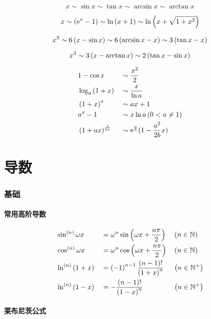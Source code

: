 \documentclass{article}
\begin{document}
\[x\sim\sin x\sim\tan x\sim\arcsin x\sim\arctan x\]

\[x\sim\left(\mathrm e^x-1\right)\sim\ln\left(x+1\right)\sim\ln\left(x+\sqrt{1+x^2}\right)\]

\[x^3\sim6\left(x-\sin x\right)\sim6\left(\arcsin x-x\right)\sim3\left(\tan x-x\right)\]

\[x^3\sim3\left(x-\arctan x\right)\sim2\left(\tan x -\sin x\right)\]

\[\begin{aligned}
         & 1-\cos x               &  & \sim\frac{x^2}2                    \\
         & \log_a{\left(1+x\right)}     &  & \sim\frac x{\ln a}                 \\
         & \left(1+x\right)^a           &  & \sim ax+1                          \\
         & a^x-1                  &  & \sim x\ln a\left(0<a\neq1\right)         \\
         & \left(1+ax\right)^\frac1{bx} &  & \sim\mathrm e^\frac ab(1-\frac{a^2}{2b}x) \\
    \end{aligned}\]

\part{导数}

\section{基础}

\subsection{常用高阶导数}

\[\begin{aligned}
         & \sin^{\left(n\right)}\omega x  &  & =\omega^n\sin\left(\omega x+\frac{n\pi}2\right)        &  & \left(n\in\mathbb N\right)  \\
         & \cos^{\left(n\right)}\omega x  &  & =\omega^n\cos{\left(\omega x+\frac{n\pi}2\right)}      &  & \left(n\in\mathbb N\right)  \\
         & \ln^{\left(n\right)}\left(1+x\right) &  & =\left(-1\right)^{n-1}\frac{\left(n-1\right)!}{\left(1+x\right)^n} &  & \left(n\in\mathbb N^+\right) \\
         & \ln^{\left(n\right)}\left(1-x\right) &  & =-\frac{\left(n-1\right)!}{\left(1-x\right)^n}               &  & \left(n\in\mathbb N^+\right) \\
    \end{aligned}\]

\subsection{莱布尼茨公式}
\end{document}
